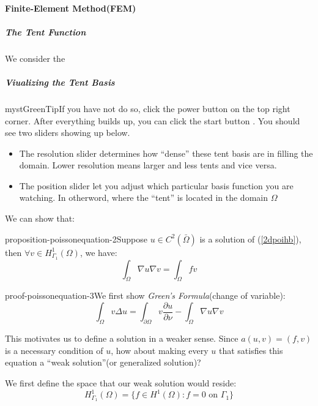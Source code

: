 \paragraph{Finite-Element Method(FEM)}

\subparagraph{The Tent Function}

We consider the

\subparagraph{Viualizing the Tent Basis}

\begin{mystadmonition}{mystGreen}{Tip}If you have not do so, click the power button on the top right corner.
After everything builds up, you can click the start button . You should see two sliders showing up below.

\begin{itemize}
\item The resolution slider determines how ``dense'' these tent basis are in filling the domain. Lower resolution means larger and less tents and vice versa.
\item The position slider let you adjust which particular basis function you are watching. In otherword, where the ``tent'' is located in the domain $\Omega$
\end{itemize}

\end{mystadmonition}


We can show that:

\begin{mystthmproposition}{}{proposition-poissonequation-2}Suppose $u \in C^2(\bar \Omega)$ is a solution of (\ref{2dpoihb}), then $\forall v \in H^1_{\Gamma_1}(\Omega)$, we have:
\begin{equation}
\int_{\Omega}\nabla u \nabla v=\int_{\Omega} fv
\end{equation}

\end{mystthmproposition}
\begin{mystthmproof}{}{proof-poissonequation-3}We first show \textit{Green's Formula}(change of variable):
\begin{equation}
\int_{\Omega}v \Delta u = \int_{\partial \Omega} v \frac{\partial u}{\partial \nu} - \int_{\Omega} \nabla u \nabla v
\end{equation}

\end{mystthmproof}
This motivates us to define a solution in a weaker sense. Since $a(u,v)=(f,v)$ is a necessary condition of $u$, how about making every $u$ that satisfies this equation a ``weak solution''(or generalized solution)?

We first define the space that our weak solution would reside:
\begin{equation}
H^1_{\Gamma_1}(\Omega)=\{f\in H^1(\Omega): f=0 \text{ on } \Gamma_1 \}
\end{equation}